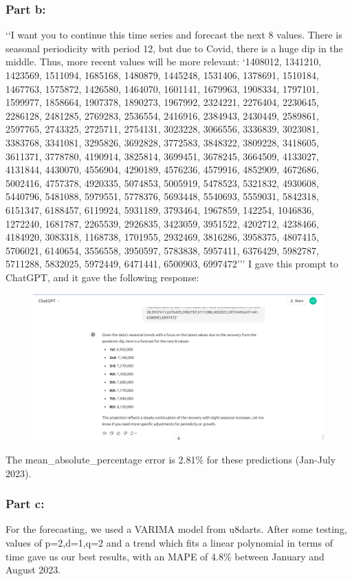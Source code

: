 \documentclass{article}
\begin{document}
\subsubsection{Part b: }
\lq\lq I want you to continue this time series and forecast the next 8 values. There is seasonal periodicity with period 12,  but due to Covid,  there is a huge dip in the middle. Thus,  more recent values will be more relevant: \lq1408012, 1341210, 1423569, 1511094, 1685168, 1480879, 1445248, 1531406, 1378691, 1510184, 1467763, 1575872, 1426580, 1464070, 1601141, 1679963, 1908334, 1797101, 1599977, 1858664, 1907378, 1890273, 1967992, 2324221, 2276404, 2230645, 2286128, 2481285, 2769283, 2536554, 2416916, 2384943, 2430449, 2589861, 2597765, 2743325, 2725711, 2754131, 3023228, 3066556, 3336839, 3023081, 3383768, 3341081, 3295826, 3692828, 3772583, 3848322, 3809228, 3418605, 3611371, 3778780, 4190914, 3825814, 3699451, 3678245, 3664509, 4133027, 4131844, 4430070, 4556904, 4290189, 4576236, 4579916, 4852909, 4672686, 5002416, 4757378, 4920335, 5074853, 5005919, 5478523, 5321832, 4930608, 5440796, 5481088, 5979551, 5778376, 5693448, 5540693, 5559031, 5842318, 6151347, 6188457, 6119924, 5931189, 3793464, 1967859, 142254, 1046836, 1272240, 1681787, 2265539, 2926835, 3423059, 3951522, 4202712, 4238466, 4184920, 3083318, 1168738, 1701955, 2932469, 3816286, 3958375, 4807415, 5706021, 6140654, 3556558, 3950597, 5783838, 5957411, 6376429, 5982787, 5711288, 5832025, 5972449, 6471441, 6500903, 6997472\rq\rq\rq
I gave this prompt to ChatGPT,  and it gave the following response:\\
\begin{figure}[H]
\centering
\includegraphics[width=\textwidth]{ChatGPT Response.png}
\end{figure}
The mean\_absolute\_percentage error is 2.81\% for these predictions (Jan-July 2023).
\subsubsection{Part c: }
For the forecasting,  we used a VARIMA model from u8darts. After some testing, values of p=2,d=1,q=2 and a trend which fits a linear polynomial in terms of time gave us our best results,  with an MAPE of 4.8\% between January and August 2023. 
\end{document}
